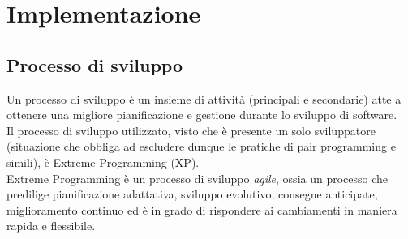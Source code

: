 \documentclass[a4paper,10pt]{report}
\begin{document}
\chapter{Implementazione}
  \section{Processo di sviluppo}
    Un processo di sviluppo è un insieme di attività (principali e secondarie)
			atte a ottenere una migliore pianificazione e gestione durante lo
			sviluppo di software.\\
			Il processo di sviluppo utilizzato, visto che è presente un solo
			sviluppatore (situazione che obbliga ad escludere dunque le pratiche
			di pair programming e simili), è Extreme Programming (XP).\\
			Extreme Programming è un processo di sviluppo {\itshape agile}, ossia un
			processo che predilige pianificazione adattativa, sviluppo evolutivo,
			consegne anticipate, miglioramento continuo ed è in grado di rispondere
			ai cambiamenti in maniera rapida e flessibile.
\end{document}
